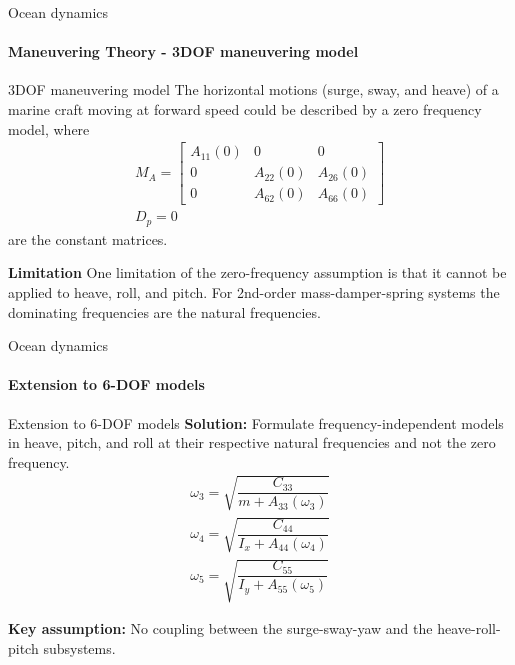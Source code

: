 

\begin{frame}{Ocean dynamics}
	\framesubtitle{Maneuvering Theory - 3DOF maneuvering model}
	\begin{block}{3DOF maneuvering model}
		The horizontal motions (surge, sway, and heave) of a marine craft moving at forward speed could be described by a zero frequency model, where
		\begin{align}
			M_A = \begin{bmatrix}
				A_{11}(0) & 0 & 0 \\
				0 & A_{22}(0) & A_{26}(0) \\
				0 & A_{62}(0) & A_{66}(0)
			\end{bmatrix}\\
			D_p = 0
		\end{align}
		are the constant matrices.
	\end{block}
	\textbf{Limitation}  One limitation of the zero-frequency assumption is that it cannot be applied to heave, roll, and pitch.  For 2nd-order mass-damper-spring systems the dominating frequencies are the natural frequencies.
\end{frame}




\begin{frame}{Ocean dynamics}
	\framesubtitle{Extension to 6-DOF models}
	\begin{block}{Extension to 6-DOF models}
		\textbf{Solution:} Formulate frequency-independent models in heave, pitch, and roll at their respective natural frequencies and not the zero frequency.
		\begin{align}
			\omega_3 = \sqrt{\dfrac{C_{33}}{m + A_{33}(\omega_3)}}\\
			\omega_4 = \sqrt{\dfrac{C_{44}}{I_x + A_{44}(\omega_4)}}\\
			\omega_5 = \sqrt{\dfrac{C_{55}}{I_y + A_{55}(\omega_5)}}
		\end{align}
	\end{block}
	\textbf{Key assumption:} No coupling between the surge-sway-yaw and the heave-roll-pitch subsystems.
\end{frame}





